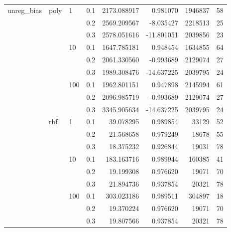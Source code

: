\begin{table}[H]
\begin{tabular}{llllrrrr}
unreg\_bias & poly & 1   & 0.1 &  2173.088917 &    0.981070 &  1946837 &    58 \\
           &     &     & 0.2 &  2569.209567 &   -8.035427 &  2218513 &    25 \\
           &     &     & 0.3 &  2578.051616 &  -11.801051 &  2039856 &    23 \\
           &     & 10  & 0.1 &  1647.785181 &    0.948454 &  1634855 &    64 \\
           &     &     & 0.2 &  2061.330560 &   -0.993689 &  2129074 &    27 \\
           &     &     & 0.3 &  1989.308476 &  -14.637225 &  2039795 &    24 \\
           &     & 100 & 0.1 &  1962.801151 &    0.947898 &  2145994 &    61 \\
           &     &     & 0.2 &  2096.985719 &   -0.993689 &  2129074 &    27 \\
           &     &     & 0.3 &  3345.905634 &  -14.637225 &  2039795 &    24 \\
           & rbf & 1   & 0.1 &    39.078295 &    0.989854 &    33129 &    52 \\
           &     &     & 0.2 &    21.568658 &    0.979249 &    18678 &    55 \\
           &     &     & 0.3 &    18.375232 &    0.926844 &    19031 &    78 \\
           &     & 10  & 0.1 &   183.163716 &    0.989944 &   160385 &    41 \\
           &     &     & 0.2 &    19.199308 &    0.976620 &    19071 &    70 \\
           &     &     & 0.3 &    21.894736 &    0.937854 &    20321 &    78 \\
           &     & 100 & 0.1 &   303.023186 &    0.989511 &   304897 &    18 \\
           &     &     & 0.2 &    19.370224 &    0.976620 &    19071 &    70 \\
           &     &     & 0.3 &    19.807566 &    0.937854 &    20321 &    78 \\
\bottomrule
\end{tabular}
\end{table}
